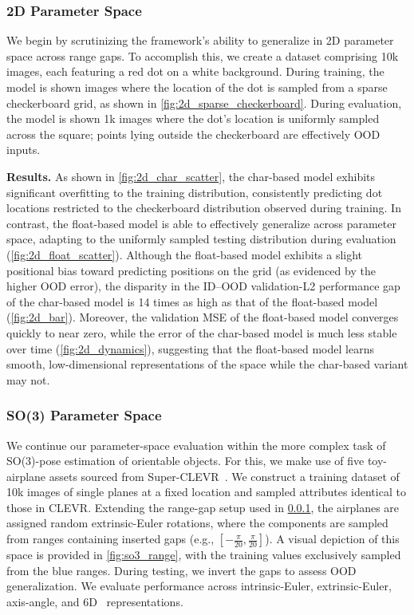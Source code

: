 

\subsubsection{2D Parameter Space}\label{sssection:2d}
We begin by scrutinizing the framework's ability to generalize in 2D parameter space across range gaps.
To accomplish this, we create a dataset comprising 10k images, each featuring a red dot on a white background.
During training, the model is shown images where the location of the dot is sampled from a sparse checkerboard grid, as shown in \cref{fig:2d_sparse_checkerboard}.
During evaluation, the model is shown 1k images where the dot's location is uniformly sampled across the square; points lying outside the checkerboard are effectively OOD inputs. 

\noindent\textbf{Results.}
As shown in \cref{fig:2d_char_scatter}, the char-based model exhibits significant overfitting to the training distribution, consistently predicting dot locations restricted to the checkerboard distribution observed during training.
In contrast, the float-based model is able to effectively generalize across parameter space, adapting to the uniformly sampled testing distribution during evaluation (\cref{fig:2d_float_scatter}).
Although the float-based model exhibits a slight positional bias toward predicting positions on the grid (as evidenced by the higher OOD error),  
the disparity in the ID--OOD validation-L2 performance gap of the char-based model is 14 times as high as that of the float-based model (\cref{fig:2d_bar}).
Moreover, the validation MSE of the float-based model converges quickly to near zero, while the error of the char-based model is much less stable over time (\cref{fig:2d_dynamics}), suggesting that the float-based model learns smooth, low-dimensional representations of the space while the char-based variant may not.

\subsubsection{SO(3) Parameter Space}\label{sssec:so3}

We continue our parameter-space evaluation within the more complex task of SO(3)-pose estimation of orientable objects.
For this, we make use of five toy-airplane assets sourced from Super-CLEVR~\citep{Li_2023_CVPR}. 
We construct a training dataset of 10k images of single planes at a fixed location and sampled attributes identical to those in CLEVR.
Extending the range-gap setup used in \cref{sssection:2d}, the airplanes are assigned random extrinsic-Euler rotations, where the components are sampled from ranges containing inserted gaps (e.g., $[-\frac{\pi}{20},\frac{\pi}{20}]$).
A visual depiction of this space is provided in \cref{fig:so3_range}, with the training values exclusively sampled from the blue ranges.
During testing, we invert the gaps to assess OOD generalization.
We evaluate performance across intrinsic-Euler, extrinsic-Euler, axis-angle, and 6D~\citep{Zhou_2019_CVPR} representations.

